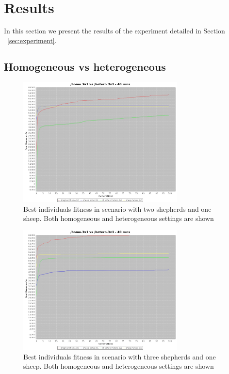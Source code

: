 \documentclass[conference]{IEEEtran}
\begin{document}
\section{Results}
In this section we present the results of the experiment detailed in Section ~\ref{sec:experiment}.

\subsection{Homogeneous vs heterogeneous}
\begin{figure}[ht]
	\centering
	\includegraphics[width=3.3in]{imgs/homo2v1-hetero2v1-bestSoFar.jpeg}
	\caption{Best individuals fitness in scenario with two shepherds and one sheep. Both homogeneous and heterogeneous settings are shown}
	\label{fig:2v1_homo_vs_hetero}
\end{figure}

\begin{figure}[ht]
	\centering
	\includegraphics[width=3.3in]{imgs/homo3v1-hetero3v1-bestSoFar.jpeg}
	\caption{Best individuals fitness in scenario with three shepherds and one sheep. Both homogeneous and heterogeneous settings are shown}
	\label{fig:3v1_homo_vs_hetero}
\end{figure}
\end{document}
